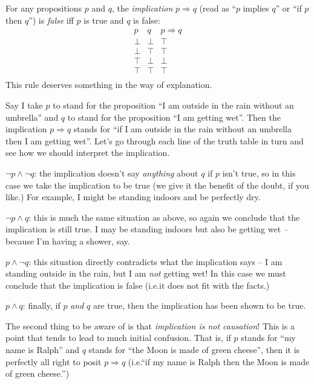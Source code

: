\documentclass[a4paper,11pt,notitlepage,onecolumn]{article}
\makeatletter
\newcommand{\ie}%
{i.e.\@ }
\newcommand{\True}%
{\top}
\newcommand{\False}%
{\perp}
\newcommand{\Not}[1]%
{\neg{}#1}
\newcommand{\Conj}%
{\wedge}
\newcommand{\Imp}%
{\Rightarrow}
\makeatother
\begin{document}
For any propositions $p$ and $q$, the \emph{implication} $p \Imp q$
(read as ``$p$ implies $q$'' or ``if $p$ then $q$'') is \emph{false} iff 
$p$ is true and $q$ is false:
\[
\begin{array}{cc|c}
p       & q       & p \Imp q \\
\hline
\False  & \False  & \True \\
\False  & \True   & \True \\
\True   & \False  & \False \\
\True   & \True   & \True \\
\end{array}
\]
This rule deserves something in the way of explanation.

Say I take $p$ to stand for the proposition ``I am outside in the rain
without an umbrella'' and $q$ to stand for the proposition ``I am
getting wet''.  Then the implication $p \Imp q$ stands for ``if I am
outside in the rain without an umbrella then I am getting wet''.  Let's
go through each line of the truth table in turn and see how we should
interpret the implication.
\begin{description}
\item $\Not{p} \Conj \Not{q}$: the implication doesn't say
\emph{anything} about $q$ if $p$ isn't true, so in this
case we take the implication to be true (we give it the benefit of the
doubt, if you like.)  For example, I might be standing indoors and be
perfectly dry.
\item $\Not{p} \Conj q$: this is much the same situation as above, so
again we conclude that the implication is still true.  I may be standing
indoors but also be getting wet -- because I'm having a shower, say.
\item $p \Conj \Not{q}$: this situation directly contradicts what the
implication says -- I am standing outside in the rain, but I am
\emph{not} getting wet!  In this case we must conclude that the
implication is false (\ie it does not fit with the facts.)
\item $p \Conj q$: finally, if $p$ \emph{and} $q$ are true, then the
implication has been shown to be true.
\end{description}

The second thing to be aware of is that \emph{implication is not
causation}!  This is a point that tends to lead to much initial
confusion.  That is, if $p$ stands for ``my name is Ralph'' and $q$
stands for ``the Moon is made of green cheese'', then it is perfectly
all right to posit $p \Imp q$ (\ie  ``if my name is Ralph then the Moon
is made of green cheese.'')
\end{document}
